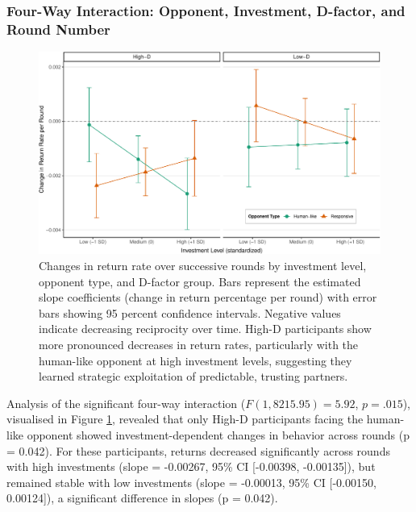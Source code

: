 \documentclass[
]{article}
\begin{document}
\subsubsection{Four-Way Interaction: Opponent, Investment, D-factor, and Round Number}\label{four-way-interaction-opponent-investment-d-factor-and-round-number}

\begin{figure}

{\centering \includegraphics[width=\textwidth]{article_files/figure-latex/oppExploit-1} 

}

\caption{Changes in return rate over successive rounds by investment level, opponent type, and D-factor group. Bars represent the estimated slope coefficients (change in return percentage per round) with error bars showing 95 percent confidence intervals. Negative values indicate decreasing reciprocity over time. High-D participants show more pronounced decreases in return rates, particularly with the human-like opponent at high investment levels, suggesting they learned strategic exploitation of predictable, trusting partners.}\label{fig:oppExploit}
\end{figure}

Analysis of the significant four-way interaction (\(F(1, 8215.95) = 5.92\), \(p = .015\)), visualised in Figure \ref{fig:oppExploit}, revealed that only High-D participants facing the human-like opponent showed investment-dependent changes in behavior across rounds (p = 0.042). For these participants, returns decreased significantly across rounds with high investments (slope = -0.00267, 95\% CI {[}-0.00398, -0.00135{]}), but remained stable with low investments (slope = -0.00013, 95\% CI {[}-0.00150, 0.00124{]}), a significant difference in slopes (p = 0.042).
\end{document}
